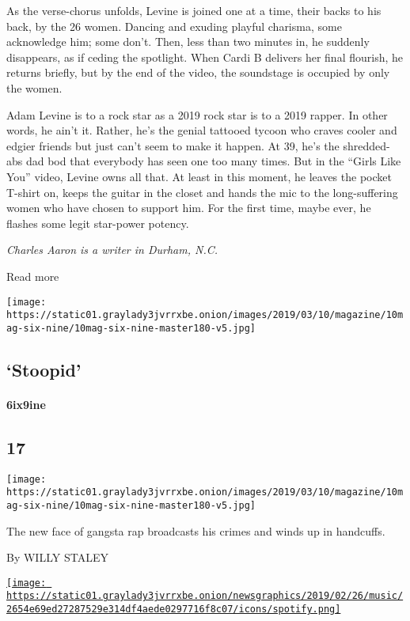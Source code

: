 As the verse-chorus unfolds, Levine is joined one at a time, their backs
to his back, by the 26 women. Dancing and exuding playful charisma, some
acknowledge him; some don't. Then, less than two minutes in, he suddenly
disappears, as if ceding the spotlight. When Cardi B delivers her final
flourish, he returns briefly, but by the end of the video, the
soundstage is occupied by only the women.

Adam Levine is to a rock star as a 2019 rock star is to a 2019 rapper.
In other words, he ain't it. Rather, he's the genial tattooed tycoon who
craves cooler and edgier friends but just can't seem to make it happen.
At 39, he's the shredded-abs dad bod that everybody has seen one too
many times. But in the ``Girls Like You'' video, Levine owns all that.
At least in this moment, he leaves the pocket T-shirt on, keeps the
guitar in the closet and hands the mic to the long-suffering women who
have chosen to support him. For the first time, maybe ever, he flashes
some legit star-power potency.

\emph{Charles Aaron is a writer in Durham, N.C.}

Read more

\texttt{[image: https://static01.graylady3jvrrxbe.onion/images/2019/03/10/magazine/10mag-six-nine/10mag-six-nine-master180-v5.jpg]}

\hypertarget{--stoopid}{%
\subsection{\texorpdfstring{ `Stoopid'}{  `Stoopid'}}\label{--stoopid}}

\hypertarget{6ix9ine}{%
\paragraph{6ix9ine}\label{6ix9ine}}

\hypertarget{17}{%
\subsection{17}\label{17}}

\texttt{[image: https://static01.graylady3jvrrxbe.onion/images/2019/03/10/magazine/10mag-six-nine/10mag-six-nine-master180-v5.jpg]}

The new face of gangsta rap broadcasts his crimes and winds up in
handcuffs.

By WILLY STALEY

\href{https://open.spotify.com/track/6k2iq1yULhXILe0i8xQqPF}{\texttt{[image: https://static01.graylady3jvrrxbe.onion/newsgraphics/2019/02/26/music/2654e69ed27287529e314df4aede0297716f8c07/icons/spotify.png]}}

